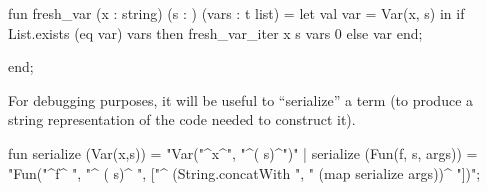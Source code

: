 fun fresh_var (x : string) (s : ) (vars : t list) = 
  let val var = Var(x, s)
  in if List.exists (eq var) vars
     then fresh_var_iter x s vars 0
     else var
  end;

end;
\eatline
{}\nwendcode{}\nwdocspar
\begin{node}
For debugging purposes, it will be useful to ``serialize'' a term (to
produce a string representation of the code needed to construct it).
\end{node}

\nwenddocs{}\endmoddef\nwstartdeflinemarkup{}\nwenddeflinemarkup
fun serialize (Var(x,s)) = "Var("^x^", "^( s)^")"
  | serialize (Fun(f, s, args)) = "Fun("^f^
                                  ", "^
                                  ( s)^
                                  ", ["^
                                  (String.concatWith ", " (map serialize args))^
                                  "])";
\eatline

\nwendcode{}

